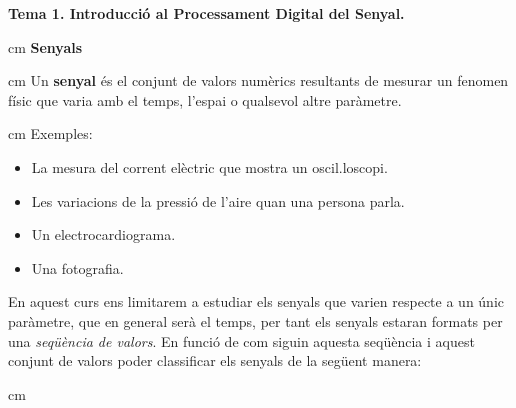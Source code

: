 \documentclass{article}
\begin{document}
\textbf{\Large Tema 1. Introducci\'o al Processament Digital del Senyal.}

 cm
\noindent
\textbf{\large Senyals}

 cm
\noindent
Un \textbf{senyal} \'es el conjunt de valors num\`erics resultants de mesurar un 
fenomen f\'isic que varia amb el temps, l'espai o qualsevol altre par\`ametre.

 cm
\noindent
Exemples:
\begin{itemize}
\item La mesura del corrent el\`ectric que mostra un oscil.loscopi.
\item Les variacions de la pressi\'o de l'aire quan una persona parla.
\item Un electrocardiograma.
\item Una fotografia.
\end{itemize}

En aquest curs ens limitarem a estudiar els senyals que varien respecte a un \'unic par\`ametre,
que en general ser\`a el temps, per tant els senyals estaran formats per una 
\textit{seq\"u\`encia de valors}. 
En funci\'o de com siguin aquesta seq\"u\`encia i aquest conjunt de valors poder classificar els
senyals de la seg\"uent manera:

 cm
\end{document}
